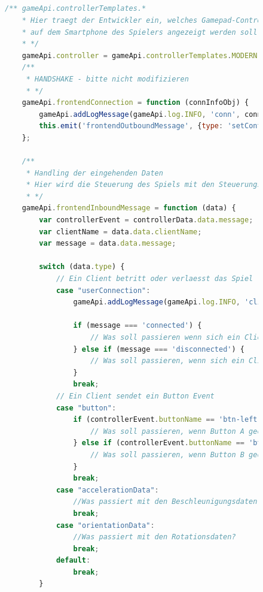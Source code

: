 \documentclass[a4paper]{spie}  %
\begin{document}
\newpage

\appendix
\begin{appendices}
  \renewcommand\thetable{\thesection\arabic{table}}
  \renewcommand\thefigure{\thesection\arabic{figure}}
\section{}
\begin{figure}[H]\label{lst:CodeSnippetGameApi}
	\centering
        \begin{lstlisting}[language=JavaScript,caption={Nutzen der GampApi}]
    /** gameApi.controllerTemplates.*
    * Hier traegt der Entwickler ein, welches Gamepad-Controller Layout
    * auf dem Smartphone des Spielers angezeigt werden soll
    * */
    gameApi.controller = gameApi.controllerTemplates.MODERN;
    /**
     * HANDSHAKE - bitte nicht modifizieren
     * */
    gameApi.frontendConnection = function (connInfoObj) {
        gameApi.addLogMessage(gameApi.log.INFO, 'conn', connInfoObj + " " + gameApi.socket.id);
        this.emit('frontendOutboundMessage', {type: 'setControllerTemplate', data: gameApi.controller});
    };

    /**
     * Handling der eingehenden Daten
     * Hier wird die Steuerung des Spiels mit den Steuerungsdaten vom Smartphone kombiniert
     * */
    gameApi.frontendInboundMessage = function (data) {
        var controllerEvent = controllerData.data.message;
        var clientName = data.data.clientName;
        var message = data.data.message;

        switch (data.type) {
            // Ein Client betritt oder verlaesst das Spiel
            case "userConnection":
                gameApi.addLogMessage(gameApi.log.INFO, 'client', 'Client ' + clientName + ' ' + message);

                if (message === 'connected') {
                    // Was soll passieren wenn sich ein Client ins Spiel einloggt
                } else if (message === 'disconnected') {
                    // Was soll passieren, wenn sich ein Client das Spiel verlaesst
                }
                break;
            // Ein Client sendet ein Button Event
            case "button":
                if (controllerEvent.buttonName == 'btn-left' && controllerEvent.buttonState === gameApi.BUTTON.DOWN) {
                    // Was soll passieren, wenn Button A gedrueckt wird
                } else if (controllerEvent.buttonName == 'btn-right' && controllerEvent.buttonState === gameApi.BUTTON.DOWN) {
                    // Was soll passieren, wenn Button B gedrueckt wird
                }
                break;
            case "accelerationData":
                //Was passiert mit den Beschleunigungsdaten?
                break;
            case "orientationData":
                //Was passiert mit den Rotationsdaten?
                break;
            default:
                break;
        }
        \end{lstlisting}
\end{figure}

\end{appendices}
\end{document}
